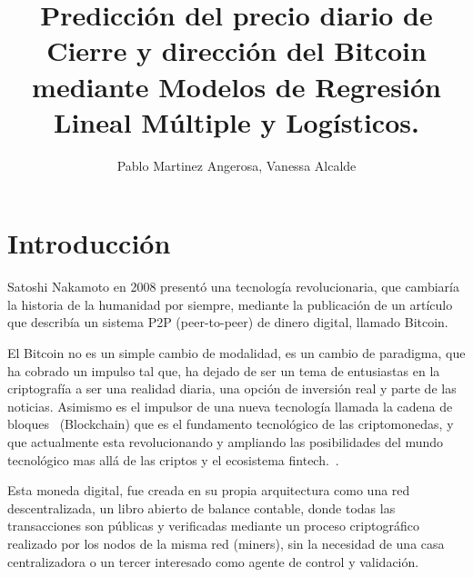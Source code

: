 \documentclass[a4paper,12pt,twocolumn]{article}
\date{ }
\title{\textbf{Predicción del precio diario de Cierre y dirección del Bitcoin mediante Modelos de Regresión Lineal Múltiple y Logísticos. }}
\author{Pablo Martinez Angerosa, Vanessa Alcalde}
\begin{document}
\setlength{\columnsep}{0.8cm}

\vspace{1.0cm}


\section{Introducción}
 Satoshi Nakamoto en 2008 presentó una tecnología revolucionaria\cite{Satoshi}, que cambiaría la historia de la humanidad por siempre, mediante la publicación de un artículo que describía un sistema P2P (peer-to-peer) de dinero digital, llamado Bitcoin. 

El Bitcoin no es un simple cambio de modalidad, es un cambio de paradigma, que ha cobrado un impulso tal que, ha dejado de ser un tema de entusiastas en la criptografía a ser una realidad diaria, una opción de inversión real y parte de las noticias. Asimismo es el impulsor de una nueva tecnología llamada la cadena de bloques~\cite{Blockchain} (Blockchain) que es el fundamento tecnológico de las criptomonedas,  y que actualmente esta revolucionando y ampliando las posibilidades del mundo tecnológico mas allá de las criptos y el ecosistema fintech.~\cite{Bitcoin_revolucion_monetaria}. 

Esta moneda digital, fue creada en su propia arquitectura como una red descentralizada, un libro abierto de balance contable, donde todas las transacciones son públicas y verificadas mediante un proceso criptográfico realizado por los nodos de la misma red (miners), sin la necesidad de una casa centralizadora o un tercer interesado como agente de control y validación\cite{Satoshi}. 
\end{document}
